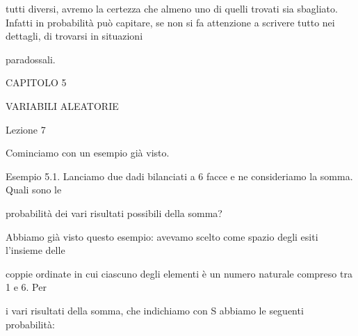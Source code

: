 \documentclass[a4paper,portrait,12pt]{article}
\begin{document}
\begin{flushleft}
tutti diversi, avremo la certezza che almeno uno di quelli trovati sia sbagliato. Infatti in probabilit\`{a} pu\`{o} capitare, se non si fa attenzione a scrivere tutto nei dettagli, di trovarsi in situazioni
\end{flushleft}


\begin{flushleft}
paradossali.
\end{flushleft}





\begin{flushleft}
\newpage
\newpage
CAPITOLO 5
\end{flushleft}


\begin{flushleft}
VARIABILI ALEATORIE
\end{flushleft}


\begin{flushleft}
Lezione 7
\end{flushleft}





\begin{flushleft}
Cominciamo con un esempio gi\`{a} visto.
\end{flushleft}


\begin{flushleft}
Esempio 5.1. Lanciamo due dadi bilanciati a 6 facce e ne consideriamo la somma. Quali sono le
\end{flushleft}


\begin{flushleft}
probabilit\`{a} dei vari risultati possibili della somma?
\end{flushleft}


\begin{flushleft}
Abbiamo gi\`{a} visto questo esempio: avevamo scelto come spazio degli esiti l'insieme delle
\end{flushleft}


\begin{flushleft}
coppie ordinate in cui ciascuno degli elementi \`{e} un numero naturale compreso tra 1 e 6. Per
\end{flushleft}


\begin{flushleft}
i vari risultati della somma, che indichiamo con S abbiamo le seguenti probabilit\`{a}:
\end{flushleft}
\end{document}
